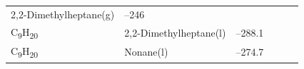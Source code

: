 \documentclass[
  9pt,
]{extbook}
\theoremstyle{definition}
\theoremstyle{definition}
\theoremstyle{definition}
\theoremstyle{remark}
\begin{document}
\begin{longtable}[]{@{}llllll@{}}
\begin{minipage}[t]{0.17\columnwidth}
2,2-Dimethylheptane(g)\strut
\end{minipage} & \begin{minipage}[t]{0.15\columnwidth}\raggedright
--246\strut
\end{minipage} & \begin{minipage}[t]{0.15\columnwidth}\raggedright
\strut
\end{minipage} & \begin{minipage}[t]{0.14\columnwidth}\raggedright
\strut
\end{minipage} & \begin{minipage}[t]{0.14\columnwidth}\raggedright
\strut
\end{minipage}\tabularnewline
\begin{minipage}[t]{0.07\columnwidth}\raggedright
C\textsubscript{9}H\textsubscript{20}\strut
\end{minipage} & \begin{minipage}[t]{0.17\columnwidth}\raggedright
2,2-Dimethylheptane(l)\strut
\end{minipage} & \begin{minipage}[t]{0.15\columnwidth}\raggedright
--288.1\strut
\end{minipage} & \begin{minipage}[t]{0.15\columnwidth}\raggedright
\strut
\end{minipage} & \begin{minipage}[t]{0.14\columnwidth}\raggedright
\strut
\end{minipage} & \begin{minipage}[t]{0.14\columnwidth}\raggedright
\strut
\end{minipage}\tabularnewline
\begin{minipage}[t]{0.07\columnwidth}\raggedright
C\textsubscript{9}H\textsubscript{20}\strut
\end{minipage} & \begin{minipage}[t]{0.17\columnwidth}\raggedright
Nonane(l)\strut
\end{minipage} & \begin{minipage}[t]{0.15\columnwidth}\raggedright
--274.7\strut
\end{minipage} & \begin{minipage}[t]{0.15\columnwidth}\raggedright
\strut
\end{minipage} & \begin{minipage}[t]{0.14\columnwidth}\raggedright
\strut
\end{minipage} & \begin{minipage}[t]{0.14\columnwidth}\raggedright

\end{minipage}
\end{longtable}
\end{document}
